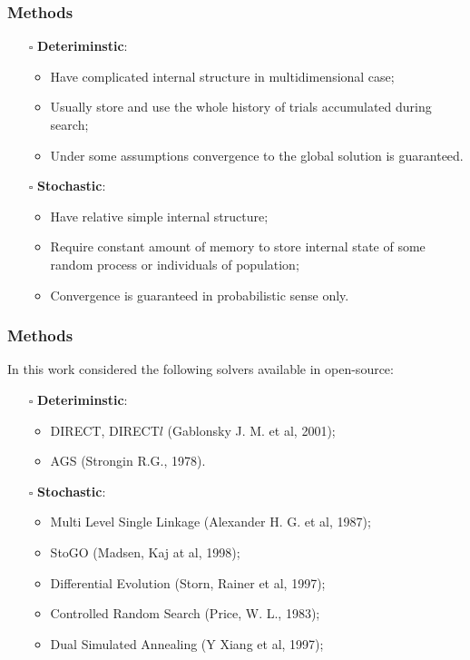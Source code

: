 \documentclass[aspectratio=1610]{beamer}
\begin{document}
\begin{frame}
  \frametitle{Methods}
  \begin{itemize}
    \item[$\square$] \textbf{Deteriminstic}:
    \begin{itemize}
      \item Have complicated internal structure in multidimensional case;
      \item Usually store and use the whole history of trials accumulated during search;
      \item Under some assumptions convergence to the global solution is guaranteed.
    \end{itemize}
    \item[$\square$] \textbf{Stochastic}:
    \begin{itemize}
      \item Have relative simple internal structure;
      \item Require constant amount of memory to store internal state of some random process or individuals of population;
      \item Convergence is guaranteed in probabilistic sense only.
    \end{itemize}
  \end{itemize}
\end{frame}

\begin{frame}
  \frametitle{Methods}
  In this work considered the following solvers available in open-source:
  \begin{itemize}
    \item[$\square$] \textbf{Deteriminstic}:
    \begin{itemize}
      \item DIRECT, DIRECT$l$ (Gablonsky J. M. et al, 2001);
      \item AGS (Strongin R.G., 1978).
    \end{itemize}
    \item[$\square$] \textbf{Stochastic}:
    \begin{itemize}
      \item Multi Level Single Linkage (Alexander H. G. et al, 1987);
      \item StoGO (Madsen, Kaj at al, 1998);
      \item Differential Evolution (Storn, Rainer et al, 1997);
      \item Controlled Random Search (Price, W. L., 1983);
      \item Dual Simulated Annealing (Y Xiang et al, 1997);
    \end{itemize}
  \end{itemize}
\end{frame}
\end{document}
